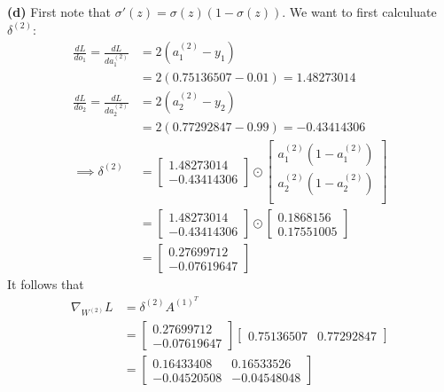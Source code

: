 \documentclass[a4paper, 12pt]{article}
\begin{document}
\begin{solution}
    \textbf{(d)} First note that $\sigma'(z) = \sigma(z)(1-\sigma(z))$. We want to first calculuate $\delta^{(2)}$:
    \begin{align*}
    \frac{dL}{do_1} = \frac{dL}{da^{(2)}_1} &= 2(a^{(2)}_1 - y_1) \\
    &= 2(0.75136507 - 0.01) = 1.48273014 \\
    \frac{dL}{do_2} = \frac{dL}{da^{(2)}_2} &= 2(a^{(2)}_2 - y_2) \\
    &= 2( 0.77292847 - 0.99) = -0.43414306 \\
    \implies \delta^{(2)} &= \begin{bmatrix}
        1.48273014 \\
        -0.43414306
    \end{bmatrix} \odot \begin{bmatrix}
        a^{(2)}_1 (1 - a^{(2)}_1) \\
        a^{(2)}_2 (1 - a^{(2)}_2) \\
    \end{bmatrix} \\
    &= \begin{bmatrix}
        1.48273014 \\
        -0.43414306
    \end{bmatrix} \odot \begin{bmatrix}
        0.1868156  \\ 0.17551005
    \end{bmatrix} \\
    &=\begin{bmatrix}
        0.27699712 \\
        -0.07619647
    \end{bmatrix}
    \end{align*}
    It follows that \begin{align*}
    \nabla_{W^{(2)}}L &= \delta^{(2)} A^{(1)^T} \\
    &= \begin{bmatrix}
        0.27699712 \\
        -0.07619647
    \end{bmatrix}
    \begin{bmatrix}
        0.75136507 & 0.77292847
    \end{bmatrix} \\
    &= \begin{bmatrix}
        0.16433408 &  0.16533526 \\
    -0.04520508  & -0.04548048
    \end{bmatrix}
    \end{align*}

\end{solution}
\end{document}
